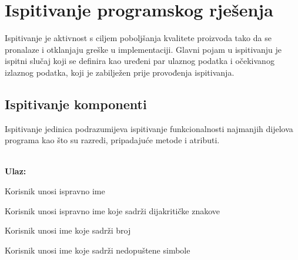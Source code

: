 			\eject 
		
	
		\section{Ispitivanje programskog rješenja}
			
			
			 
			 Ispitivanje je aktivnost s ciljem poboljšanja kvalitete proizvoda tako da se pronalaze i otklanjaju greške u implementaciji. Glavni pojam u ispitivanju je ispitni slučaj koji se definira kao uređeni par ulaznog podatka i očekivanog izlaznog podatka, koji je zabilježen prije provođenja ispitivanja.
	
			
			\subsection{Ispitivanje komponenti}
			
			Ispitivanje jedinica podrazumijeva ispitivanje funkcionalnosti najmanjih dijelova programa kao što su razredi, pripadajuće metode i atributi.
			
				\noindent {}\\
			\textbf{Ulaz: }	
			\begin{packed_enum}
				\item Korisnik unosi ispravno ime
				\item Korisnik unosi ispravno ime koje sadrži dijakritičke znakove
				\item Korisnik unosi ime koje sadrži broj
				\item Korisnik unosi ime koje sadrži nedopuštene simbole
				
			\end{packed_enum}
			
